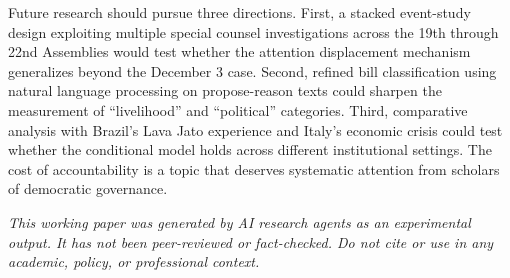\documentclass[11pt]{article}
\begin{document}
Future research should pursue three directions. First, a stacked event-study design exploiting multiple special counsel investigations across the 19th through 22nd Assemblies would test whether the attention displacement mechanism generalizes beyond the December 3 case. Second, refined bill classification using natural language processing on propose-reason texts could sharpen the measurement of ``livelihood'' and ``political'' categories. Third, comparative analysis with Brazil's Lava Jato experience \citep{katz2018} and Italy's economic crisis \citep{pedrazzani2018} could test whether the conditional model holds across different institutional settings. The cost of accountability is a topic that deserves systematic attention from scholars of democratic governance.

\noindent\textit{This working paper was generated by AI research agents as an
experimental output. It has not been peer-reviewed or fact-checked.
Do not cite or use in any academic, policy, or professional context.}



\end{document}
